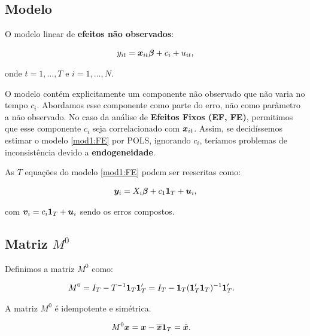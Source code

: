 \documentclass[11pt, oneside, a4paper, article]{article}
\numberwithin{equation}{section}
\begin{document}
\subsection{Modelo}

O modelo linear de \textbf{efeitos não observados}:

\vspace{-1 em}
\begin{align} \label{mod1:FE}
	y_{it} = \boldsymbol{x}_{it} \boldsymbol{\beta} + c_{i} + u_{it},
\end{align}

\noindent
onde
$t = 1, \dots, T$ e $i = 1, \dots, N$.

O modelo contém explicitamente um componente não observado que não varia no tempo $c_{i}$.
Abordamos esse componente como parte do erro, não como parâmetro a não observado.
No caso da análise de \textbf{Efeitos Fixos (EF, FE)}, permitimos que esse componente $c_{i}$ seja correlacionado com $\boldsymbol{x}_{it}$.
Assim, se decidíssemos estimar o modelo \eqref{mod1:FE} por POLS, ignorando $c_{i}$, teríamos problemas de inconsistência devido a \textbf{endogeneidade}.

As $T$ equações do modelo \eqref{mod1:FE} podem ser reescritas como:

\vspace{-1 em}
\begin{align} \label{mod2:FE}
	\boldsymbol{y}_{i} = X_{i} \boldsymbol{\beta} + c_{1} \boldsymbol{1}_{T} + \boldsymbol{u}_{i},
\end{align}

\noindent
com
$\boldsymbol{v}_{i} = c_{i} \boldsymbol{1}_{T} + \boldsymbol{u}_{i}$ sendo os erros compostos.

\subsection*{Matriz $M^{0}$}

Definimos a matriz $M^{0}$ como:

\vspace{-1 em}
\begin{align*}
	M^{0} &=
	I_{T} - T^{-1} \boldsymbol{1}_{T} \boldsymbol{1}_{T}'
	=
	I_{T} - \boldsymbol{1}_{T} (\boldsymbol{1}_{T}' \boldsymbol{1}_{T})^{-1} \boldsymbol{1}_{T}'.
\end{align*}

\noindent
A matriz $M^{0}$ é idempotente e simétrica.

\begin{align*}
	M^{0} \boldsymbol{x} &= \boldsymbol{x} - \overline{\boldsymbol{x}} \boldsymbol{1}_{T}
	= \ddot{\boldsymbol{x}}.
\end{align*}
\end{document}
